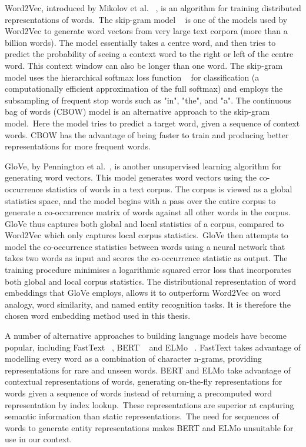 \noindent Word2Vec, introduced by Mikolov et al. \unskip~\citep{mikolov2013distributed}, is an algorithm for training distributed representations of words.\ The skip-gram model \unskip ~\citep{mikolov2013efficient} is one of the models used by Word2Vec to generate word vectors from very large text corpora (more than a billion words). The model essentially takes a centre word, and then tries to predict the probability of seeing a context word to the right or left of the centre word. This context window can also be longer than one word. The skip-gram model uses the hierarchical softmax loss function \unskip~\citep{morin2005hierarchical} for classification (a computationally efficient approximation of the full softmax) and employs the subsampling of frequent stop words such as "in", "the", and "a". The continuous bag of words (CBOW) model is an alternative approach to the skip-gram model.\ Here the model tries to predict a target word, given a sequence of context words. CBOW has the advantage of being faster to train and producing better representations for more frequent words. \par

\noindent GloVe, by Pennington et al.\unskip~\citep{pennington2014glove}, is another unsupervised learning algorithm for generating word vectors. This model generates word vectors using the co-occurrence statistics of words in a text corpus. The corpus is viewed as a global statistics space, and the model begins with a pass over the entire corpus to generate a co-occurrence matrix of words against all other words in the corpus. GloVe thus captures both global and local statistics of a corpus, compared to Word2Vec which only captures local corpus statistics.\ GloVe then attempts to model the co-occurrence statistics between words using a neural network that takes two words as input and scores the co-occurrence statistic as output. The training procedure minimises a logarithmic squared error loss that incorporates both global and local corpus statistics. The distributional representation of word embeddings that GloVe employs, allows it to outperform Word2Vec on word analogy, word similarity, and named entity recognition tasks. It is therefore the chosen word embedding method used in this thesis. \par

\noindent A number of alternative approaches to building language models have become popular, including FastText \unskip~\citep{bojanowski2016enriching}, BERT \unskip~\citep{vaswani2017attention} and ELMo \unskip~\citep{peters2018deep}. FastText takes advantage of modelling every word as a combination of character n-grams, providing representations for rare and unseen words. BERT and ELMo take advantage of contextual representations of words, generating on-the-fly representations for words given a sequence of words instead of returning a precomputed word representation by index lookup.\ These representations are superior at capturing semantic information than static representations.\ The need for sequences of words to generate entity representations makes BERT and ELMo unsuitable for use in our context.



